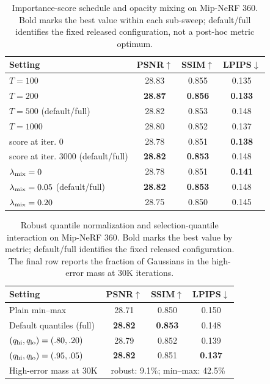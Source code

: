 \documentclass[sigconf]{acmart}
\begin{document}
\begin{table}[t]
    \centering
    \footnotesize
    \caption{Importance-score schedule and opacity mixing on Mip-NeRF 360. Bold marks the best value within each sub-sweep; default/full identifies the fixed released configuration, not a post-hoc metric optimum.}
    \label{tab:supp_schedule}
    \begin{tabular}{lccc}
        \toprule
        Setting & PSNR$\uparrow$ & SSIM$\uparrow$ & LPIPS$\downarrow$ \\
        \midrule
        $T=100$ & 28.83 & 0.855 & 0.135 \\
        $T=200$ & \textbf{28.87} & \textbf{0.856} & \textbf{0.133} \\
        $T=500$ (default/full) & 28.82 & 0.853 & 0.148 \\
        $T=1000$ & 28.80 & 0.852 & 0.137 \\
        \midrule
        score at iter. 0 & 28.78 & 0.851 & \textbf{0.138} \\
        score at iter. 3000 (default/full) & \textbf{28.82} & \textbf{0.853} & 0.148 \\
        \midrule
        $\lambda_{\rm mix}=0$ & 28.78 & 0.851 & \textbf{0.141} \\
        $\lambda_{\rm mix}=0.05$ (default/full) & \textbf{28.82} & \textbf{0.853} & 0.148 \\
        $\lambda_{\rm mix}=0.20$ & 28.75 & 0.850 & 0.145 \\
        \bottomrule
    \end{tabular}
\end{table}

\begin{table}[t]
    \centering
    \footnotesize
    \caption{Robust quantile normalization and selection-quantile interaction on Mip-NeRF 360. Bold marks the best value by metric; default/full identifies the fixed released configuration. The final row reports the fraction of Gaussians in the high-error mass at 30K iterations.}
    \label{tab:supp_quantiles}
    \begin{tabular}{lccc}
        \toprule
        Setting & PSNR$\uparrow$ & SSIM$\uparrow$ & LPIPS$\downarrow$ \\
        \midrule
        Plain min--max & 28.71 & 0.850 & 0.150 \\
        Default quantiles (full) & \textbf{28.82} & \textbf{0.853} & 0.148 \\
        $(q_{\rm hi},q_{\rm lo})=(.80,.20)$ & 28.79 & 0.852 & 0.139 \\
        $(q_{\rm hi},q_{\rm lo})=(.95,.05)$ & \textbf{28.82} & 0.851 & \textbf{0.137} \\
        High-error mass at 30K & \multicolumn{3}{c}{robust: 9.1\%; min--max: 42.5\%} \\
        \bottomrule
    \end{tabular}
\end{table}
\end{document}
